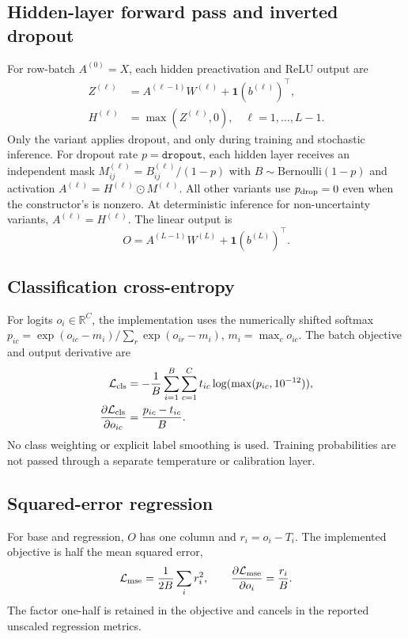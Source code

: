 \documentclass[conference]{IEEEtran}
\begin{document}
\subsection{Hidden-layer forward pass and inverted dropout}
For row-batch $A^{(0)}=X$, each hidden preactivation and ReLU output are
\begin{align}
 Z^{(\ell)}&=A^{(\ell-1)}W^{(\ell)}+\mathbf1(b^{(\ell)})^\top,\\
 H^{(\ell)}&=\max(Z^{(\ell)},0),\quad \ell=1,\ldots,L-1.
 \label{eq:hidden}
\end{align}
Only the  variant applies dropout, and only during training and stochastic inference. For dropout rate $p=\texttt{dropout}$, each hidden layer receives an independent mask $M^{(\ell)}_{ij}=B^{(\ell)}_{ij}/(1-p)$ with $B\sim\mathrm{Bernoulli}(1-p)$ and activation $A^{(\ell)}=H^{(\ell)}\odot M^{(\ell)}$. All other variants use $p_{\rm drop}=0$ even when the constructor's  is nonzero. At deterministic inference for non-uncertainty variants, $A^{(\ell)}=H^{(\ell)}$. The linear output is
\begin{equation}
 O=A^{(L-1)}W^{(L)}+\mathbf1(b^{(L)})^\top.
 \label{eq:out}
\end{equation}

\subsection{Classification cross-entropy}
For logits $o_i\in\mathbb R^C$, the implementation uses the numerically shifted softmax $p_{ic}=\exp(o_{ic}-m_i)/\sum_r\exp(o_{ir}-m_i)$, $m_i=\max_c o_{ic}$. The batch objective and output derivative are
\begin{align}
 \mathcal L_{\rm cls}&=-\frac1B\sum_{i=1}^B\sum_{c=1}^C t_{ic}\log(\max(p_{ic},10^{-12})),\\
 \frac{\partial\mathcal L_{\rm cls}}{\partial o_{ic}}&=\frac{p_{ic}-t_{ic}}{B}.
 \label{eq:ce}
\end{align}
No class weighting or explicit label smoothing is used. Training probabilities are not passed through a separate temperature or calibration layer.

\subsection{Squared-error regression}
For base and  regression, $O$ has one column and $r_i=o_i-T_i$. The implemented objective is half the mean squared error,
\begin{equation}
 \mathcal L_{\rm mse}=\frac{1}{2B}\sum_i r_i^2,\qquad
 \frac{\partial\mathcal L_{\rm mse}}{\partial o_i}=\frac{r_i}{B}.
 \label{eq:mse}
\end{equation}
The factor one-half is retained in the objective and cancels in the reported unscaled regression metrics.
\end{document}
